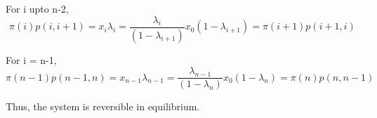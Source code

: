 \documentclass[a4paper,11pt]{article}
\begin{document}
\begin{enumerate}
For i upto n-2,
\[\pi(i)p(i,i+1)=x_i \lambda_i= \frac{\lambda_i}{(1-\lambda_{i+1})}x_0(1-\lambda_{i+1})=\pi(i+1)p(i+1,i)\]

For i = n-1,
\[\pi(n-1)p(n-1,n)=x_{n-1} \lambda_{n-1}= \frac{\lambda_{n-1}}{(1-\lambda_{n})}x_0(1-\lambda_{n})=\pi(n)p(n,n-1)\]

Thus, the system is reversible in equilibrium.
\end{enumerate} 
\end{document}
